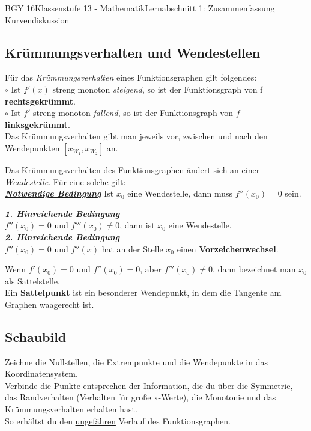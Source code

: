 \documentclass[11pt,twocolumn,oneside,openany,headings=optiontotoc,11pt,numbers=noenddot]{article}
\begin{document}
\begin{worksheet}{BGY 16}{Klassenstufe 13 - Mathematik}{Lernabschnitt 1: Zusammenfassung Kurvendiskussion}
		\subsection{Krümmungsverhalten und Wendestellen}
		Für das \textit{Krümmungsverhalten} eines Funktionsgraphen gilt folgendes:\\
		\(\circ\) Ist \(f'(x)\) streng monoton \textit{steigend}, so ist der Funktionsgraph von f \textbf{rechtsgekrümmt}.\\
		\(\circ\) Ist \(f'\) streng monoton \textit{fallend}, so ist der Funktionsgraph von \(f\) \textbf{linksgekrümmt}.\\
		\small{Das Krümmungsverhalten gibt man jeweils vor, zwischen und nach den Wendepunkten \([x_{W_1}, x_{W_2}]\) an.}\normalsize
		\par\noindent
		Das Krümmungsverhalten des Funktionsgraphen ändert sich an einer \textit{Wendestelle}. Für eine solche gilt:\\
		\textit{\underline{\textbf{Notwendige Bedingung}}} Ist \(x_0\) eine Wendestelle, dann muss \(f''(x_0)  = 0\) sein.\\
		\par\noindent
		\textbf{\textit{1. Hinreichende Bedingung}}\\
		\(f''(x_0)=0\) und \(f'''(x_0) \neq 0\), dann ist \(x_0\) eine Wendestelle.\\
		\textbf{\textit{2. Hinreichende Bedingung}}\\\(f''(x_0)=0\) und \(f''(x)\) hat an der Stelle \(x_0\) einen \textbf{Vorzeichenwechsel}.\\
		\par\noindent
		Wenn \(f'(x_0) = 0\) und \(f''(x_0)= 0\), aber \(f'''(x_0)\neq 0\), dann bezeichnet man \(x_0\) als Sattelstelle.\\
		Ein \textbf{Sattelpunkt} ist ein besonderer Wendepunkt, in dem die Tangente am Graphen waagerecht ist.\\
		\subsection{Schaubild} Zeichne die Nullstellen, die Extrempunkte und die Wendepunkte in das Koordinatensystem.\\
		Verbinde die Punkte entsprechen der Information, die du über die Symmetrie, das Randverhalten (Verhalten für große x-Werte), die Monotonie und das Krümmungsverhalten erhalten hast.\\
		So erhältst du den \underline{ungefähren} Verlauf des Funktionsgraphen.\\
		\\

\end{worksheet}
\end{document}
